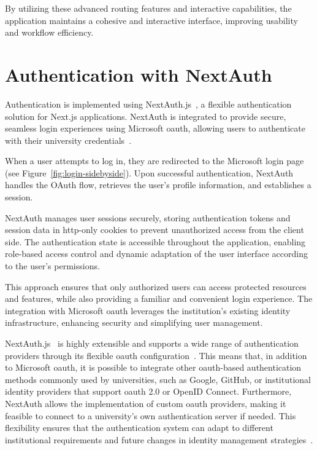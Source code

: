 By utilizing these advanced routing features and interactive capabilities, the application maintains a cohesive and interactive interface, improving usability and workflow efficiency.

\section{Authentication with NextAuth}

Authentication is implemented using NextAuth.js~\cite{nextauth}, a flexible authentication solution for Next.js applications. NextAuth is integrated to provide secure, seamless login experiences using Microsoft \ac{oauth}, allowing users to authenticate with their university credentials~\cite{nextjs-authentication}.

When a user attempts to log in, they are redirected to the Microsoft login page (see Figure~\ref{fig:login-sidebyside}). Upon successful authentication, NextAuth handles the OAuth flow, retrieves the user’s profile information, and establishes a session.

NextAuth manages user sessions securely, storing authentication tokens and session data in \ac{http}-only cookies to prevent unauthorized access from the client side. The authentication state is accessible throughout the application, enabling role-based access control and dynamic adaptation of the user interface according to the user's permissions.

This approach ensures that only authorized users can access protected resources and features, while also providing a familiar and convenient login experience. The integration with Microsoft \ac{oauth} leverages the institution's existing identity infrastructure, enhancing security and simplifying user management.

NextAuth.js~\cite{nextauth} is highly extensible and supports a wide range of authentication providers through its flexible \ac{oauth} configuration~\cite{nextjs-authentication}. This means that, in addition to Microsoft \ac{oauth}, it is possible to integrate other \ac{oauth}-based authentication methods commonly used by universities, such as Google, GitHub, or institutional identity providers that support \ac{oauth} 2.0 or OpenID Connect. Furthermore, NextAuth allows the implementation of custom \ac{oauth} providers, making it feasible to connect to a university's own authentication server if needed. This flexibility ensures that the authentication system can adapt to different institutional requirements and future changes in identity management strategies~\cite{nextjs-authentication}.

